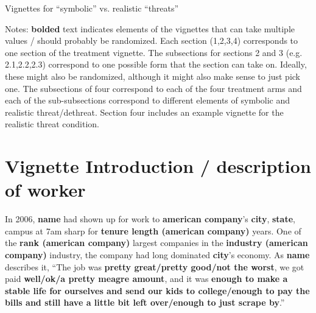 \documentclass[12pt]{article}
\begin{document}
\begin{center}
\large{Vignettes for ``symbolic'' vs. realistic ``threats''}\\ 

\vspace{-.75em}
\normalsize{
}
\vspace{.75em}
\end{center}
\noindent



\normalsize


Notes: \textbf{bolded} text indicates elements of the vignettes that can take multiple values / should probably be randomized. Each section (1,2,3,4) corresponds to one section of the treatment vignette. The subsections for sections 2 and 3 (e.g. 2.1,2.2,2.3) correspond to one possible form that the section can take on. Ideally, these might also be randomized, although it might also make sense to just pick one. The subsections of four correspond to each of the four treatment arms and each of the sub-subsections correspond to different elements of symbolic and realistic threat/dethreat. Section four includes an example vignette for the realistic threat condition.

\section{Vignette Introduction / description of worker}

In 2006, \textbf{name} had shown up for work to \textbf{american company}'s \textbf{city}, \textbf{state}, campus at 7am sharp for \textbf{tenure length (american company)} years. One of the \textbf{rank (american company)} largest companies in the  \textbf{industry (american company)} industry, the company had long dominated \textbf{city}'s economy. As \textbf{name} describes it, ``The job was \textbf{pretty great/pretty good/not the worst}, we got paid \textbf{well/ok/a pretty meagre amount}, and it was \textbf{enough to make a stable life for ourselves and send our kids to college/enough to pay the bills and still have a little bit left over/enough to just scrape by}.''
\end{document}
